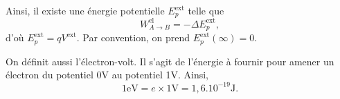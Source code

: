         Ainsi, il existe une énergie potentielle $E_{p}^{\text{ext}}$ telle que 
        \begin{equation*}
            W_{A\to B}^{\text{el}}=-\Delta E_{p}^{\text{ext}},
        \end{equation*}
        d'où $E_{p}^{\text{ext}}=qV^{\text{ext}}$. Par convention, on prend $E_p^{\text{ext}}(\infty)=0$.

        On définit aussi l'électron-volt. Il s'agit de l'énergie à fournir pour amener un électron du potentiel 0\si{\volt} au potentiel 1\si{\volt}. Ainsi, 
        \begin{equation*}
            \boxed{
                1\si{\electronvolt}=e\times1\si{\volt}=1,6.10^{-19}\si{\joule}.
            }
        \end{equation*}        